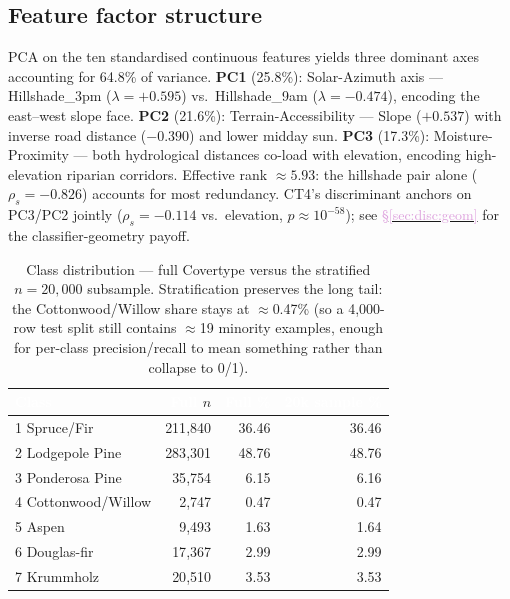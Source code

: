 \documentclass[conference]{IEEEtran}
\newcommand{\secref}[1]{\hyperref[#1]{\textcolor{plum}{\S\ref*{#1}}}}
\begin{document}
\subsection{Feature factor structure}\label{sec:eda:factor}
PCA on the ten standardised continuous features yields three dominant axes
accounting for 64.8\% of variance.
\textbf{PC1} (25.8\%): Solar-Azimuth axis --- Hillshade\_3pm ($\lambda{=}{+}0.595$)
vs.\ Hillshade\_9am ($\lambda{=}{-}0.474$), encoding the east--west slope face.
\textbf{PC2} (21.6\%): Terrain-Accessibility --- Slope ($+0.537$) with
inverse road distance ($-0.390$) and lower midday sun.
\textbf{PC3} (17.3\%): Moisture-Proximity --- both hydrological distances
co-load with elevation, encoding high-elevation riparian corridors.
Effective rank $\approx 5.93$: the hillshade pair alone ($\rho_s{=}{-}0.826$)
accounts for most redundancy.
CT4's discriminant anchors on PC3/PC2 jointly
($\rho_s{=}{-}0.114$ vs.\ elevation, $p{\approx}10^{-58}$);
see \secref{sec:disc:geom} for the classifier-geometry payoff.

\begin{table}[t]\centering
\caption{Class distribution --- full Covertype versus the stratified
$n{=}20{,}000$ subsample. Stratification preserves the long tail: the
Cottonwood/Willow share stays at $\approx$0.47\% (so a 4{,}000-row test split
still contains $\approx$19 minority examples, enough for per-class precision/recall
to mean something rather than collapse to 0/1).}
\label{tab:eda_class}
\centering\small
{}
\begin{tabularx}{\linewidth}{Xrrr}
\toprule
\rowcolor{denimdark}
\textcolor{white}{\textbf{Class}} & \textcolor{white}{\textbf{Full}} $n$ & \textcolor{white}{\textbf{Full \%}} & \textcolor{white}{\textbf{20k sample \%}} \\
\midrule
1 Spruce/Fir              & 211{,}840 & 36.46 & 36.46 \\
2 Lodgepole Pine          & 283{,}301 & 48.76 & 48.76 \\
3 Ponderosa Pine          &  35{,}754 &  6.15 &  6.16 \\
4 Cottonwood/Willow       &   2{,}747 &  0.47 &  0.47 \\
5 Aspen                   &   9{,}493 &  1.63 &  1.64 \\
6 Douglas-fir             &  17{,}367 &  2.99 &  2.99 \\
7 Krummholz               &  20{,}510 &  3.53 &  3.53 \\
\bottomrule
\end{tabularx}
\end{table}
\end{document}
